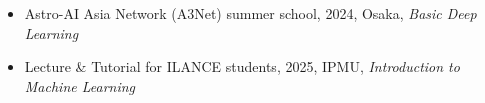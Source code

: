 \begin{itemize}
\item Astro-AI Asia Network (A3Net) summer school, 2024, Osaka, \emph{Basic Deep Learning} 
\item Lecture \& Tutorial for ILANCE students, 2025, IPMU, \emph{Introduction to Machine Learning}
\end{itemize}
